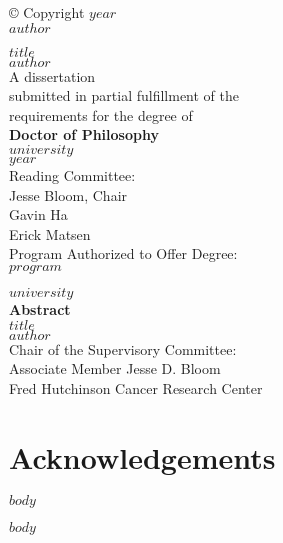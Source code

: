 \documentclass{report}
\begin{document}
\thispagestyle{empty}
\vspace*{\fill}
\begin{center}
© Copyright $year$ \\
$author$
\end{center}
\vspace*{\fill}
\newpage

\thispagestyle{empty}
\vspace*{\fill}
\begin{center}
\huge{$title$} \\
\vspace{1cm}
\Large{$author$} \\
\vspace{1cm}
A dissertation \\
submitted in partial fulfillment of the \\
requirements for the degree of \\
\vspace{1cm}
\textbf{Doctor of Philosophy} \\
\vspace{1cm}
$university$ \\
$year$ \\
\vspace{1cm}
Reading Committee: \\
Jesse Bloom, Chair \\
Gavin Ha \\
Erick Matsen \\
\vspace{1cm}
Program Authorized to Offer Degree: \\
$program$
\end{center}
\vspace*{\fill}
\newpage

\thispagestyle{empty}
\vspace*{\fill}
\begin{center}
$university$ \\
\vspace{1cm}
\textbf{Abstract} \\
\vspace{1cm}
\huge{$title$} \\
\vspace{1cm}
\Large{$author$} \\
\vspace{1cm}
Chair of the Supervisory Committee: \\
Associate Member Jesse D. Bloom \\
Fred Hutchinson Cancer Research Center \\
\vspace{1cm}
\end{center}
\vspace*{\fill}
\newpage

\tableofcontents
\newpage

\listoffigures
\newpage

\chapter*{Acknowledgements}
$body$

$body$



\end{document}

